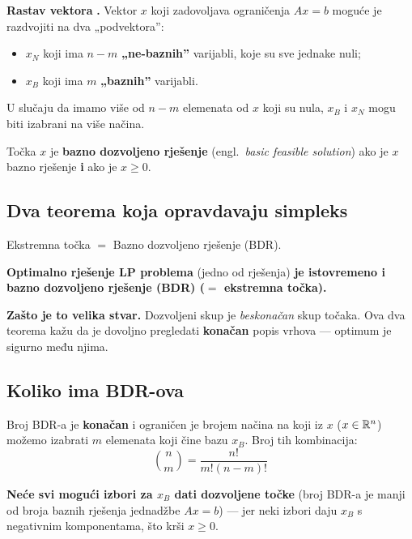 \textbf{Rastav vektora} \textbf{.} Vektor $x$ koji zadovoljava
ograničenja $Ax = b$ moguće je razdvojiti na dva „podvektora”:

\begin{itemize}
  \item $x_N$ koji ima $n - m$ \textbf{„ne-baznih”} varijabli, koje su sve
        jednake nuli;
  \item $x_B$ koji ima $m$ \textbf{„baznih”} varijabli.
\end{itemize}

U slučaju da imamo više od $n-m$ elemenata od $x$ koji su nula, $x_B$ i $x_N$
mogu biti izabrani na više načina.

\begin{definicija}
Točka $x$ je \textbf{bazno dozvoljeno rješenje} (engl.\ \emph{basic feasible
solution}) ako je $x$ bazno rješenje \textbf{i} ako je $x \ge 0$.
\end{definicija}

\subsection{Dva teorema koja opravdavaju simpleks}

\begin{teorem}[\str{18}]
Ekstremna točka $=$ Bazno dozvoljeno rješenje (BDR).
\end{teorem}

\begin{teorem}[\str{18}]
\textbf{Optimalno rješenje LP problema} (jedno od rješenja) \textbf{je
istovremeno i bazno dozvoljeno rješenje (BDR) ($=$ ekstremna točka).}
\end{teorem}

\textbf{Zašto je to velika stvar.} Dozvoljeni skup je \emph{beskonačan} skup
točaka. Ova dva teorema kažu da je dovoljno pregledati \textbf{konačan} popis
vrhova --- optimum je sigurno među njima.

\subsection{Koliko ima BDR-ova}

Broj BDR-a je \textbf{konačan} i ograničen je brojem načina na koji iz $x$
($x \in \mathbb{R}^n$) možemo izabrati $m$ elemenata koji čine bazu $x_B$. Broj tih
kombinacija:
\[
\binom{n}{m} = \frac{n!}{m!(n-m)!}
\]

\textbf{Neće svi mogući izbori za $x_B$ dati dozvoljene točke} (broj BDR-a je
manji od broja baznih rješenja jednadžbe $Ax = b$) --- jer neki izbori daju
$x_B$ s negativnim komponentama, što krši $x \ge 0$.

